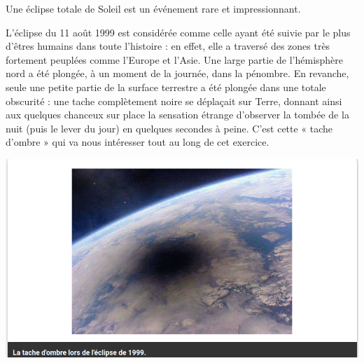 \documentclass[10pt]{article}
\begin{document}
\begin{minipage}[c]{0.45\textwidth}
	Une éclipse totale de Soleil est un événement rare et impressionnant.

	L'éclipse du 11 août 1999 est considérée comme celle ayant été suivie par le plus d'êtres humains dans toute l'histoire :
	en effet, elle a traversé des zones très fortement peuplées comme l'Europe et l'Asie.
	Une large partie de l'hémisphère nord a été plongée, à un moment de la journée, dans la pénombre. En revanche, seule une
	petite partie de la surface terrestre a été plongée dans une totale obscurité : une tache complètement noire se déplaçait
	sur Terre, donnant ainsi aux quelques chanceux sur place la sensation étrange d'observer la tombée de la nuit (puis le lever du jour)
	en quelques secondes à peine. C'est cette « tache d'ombre » qui va nous intéresser tout au long de cet exercice.

\end{minipage}
\hspace{0.05\textwidth}
\begin{minipage}[c]{0.45\textwidth}
	\centering
	\includegraphics[scale=0.3]{eclipse/photo.png}
\end{minipage}
\vspace{5pt}
\end{document}
